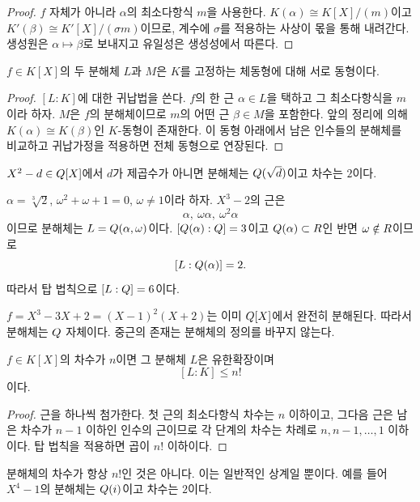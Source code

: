 \begin{proof}
$f$ 자체가 아니라 $\alpha$의 최소다항식 $m$을 사용한다. $K(\alpha)\cong K[X]/(m)$이고 $K'(\beta)\cong K'[X]/(\sigma m)$이므로, 계수에 $\sigma$를 적용하는 사상이 몫을 통해 내려간다. 생성원은 $\alpha\mapsto\beta$로 보내지고 유일성은 생성성에서 따른다.
\end{proof}

\begin{theorem}
$f\in K[X]$의 두 분해체 $L$과 $M$은 $K$를 고정하는 체동형에 대해 서로 동형이다.
\end{theorem}

\begin{proof}
$[L:K]$에 대한 귀납법을 쓴다. $f$의 한 근 $\alpha\in L$을 택하고 그 최소다항식을 $m$이라 하자. $M$은 $f$의 분해체이므로 $m$의 어떤 근 $\beta\in M$을 포함한다. 앞의 정리에 의해 $K(\alpha)\cong K(\beta)$인 $K$-동형이 존재한다. 이 동형 아래에서 남은 인수들의 분해체를 비교하고 귀납가정을 적용하면 전체 동형으로 연장된다.
\end{proof}

\begin{example}[이차다항식]
$X^2-d\in Q[X]$에서 $d$가 제곱수가 아니면 분해체는 $Q(\sqrt d)$이고 차수는 $2$이다.
\end{example}

\begin{example}
$\alpha=\sqrt[3]{2}$, $\omega^2+\omega+1=0$, $\omega\ne1$이라 하자. $X^3-2$의 근은
\[
  \alpha,\ \omega\alpha,\ \omega^2\alpha
\]
이므로 분해체는 $L=Q(\alpha,\omega)$이다. $[Q(\alpha):Q]=3$이고 $Q(\alpha)\subset R$인 반면 $\omega\notin R$이므로
\[
  [L:Q(\alpha)]=2.
\]
따라서 탑 법칙으로 $[L:Q]=6$이다.
\end{example}

\begin{example}[이미 한 근이 있으면]
$f=X^3-3X+2=(X-1)^2(X+2)$는 이미 $Q[X]$에서 완전히 분해된다. 따라서 분해체는 $Q$ 자체이다. 중근의 존재는 분해체의 정의를 바꾸지 않는다.
\end{example}

\begin{proposition}
$f\in K[X]$의 차수가 $n$이면 그 분해체 $L$은 유한확장이며
\[
  [L:K]\le n!
\]
이다.
\end{proposition}

\begin{proof}
근을 하나씩 첨가한다. 첫 근의 최소다항식 차수는 $n$ 이하이고, 그다음 근은 남은 차수가 $n-1$ 이하인 인수의 근이므로 각 단계의 차수는 차례로 $n,n-1,\dots,1$ 이하이다. 탑 법칙을 적용하면 곱이 $n!$ 이하이다.
\end{proof}

\begin{pitfall}
분해체의 차수가 항상 $n!$인 것은 아니다. 이는 일반적인 상계일 뿐이다. 예를 들어 $X^4-1$의 분해체는 $Q(i)$이고 차수는 $2$이다.
\end{pitfall}
